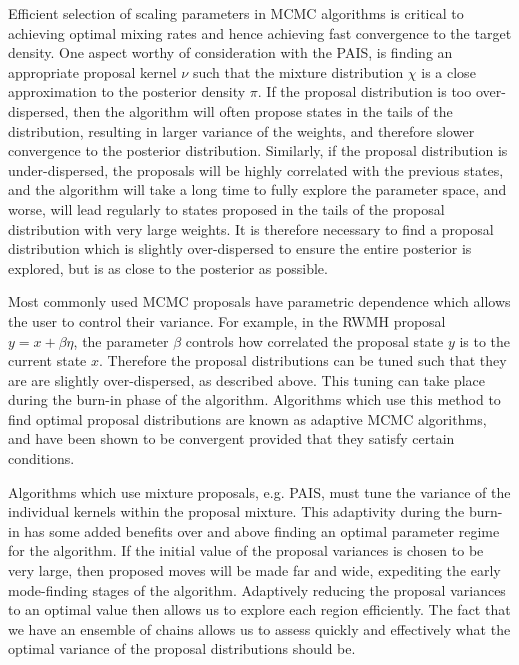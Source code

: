 \documentclass[final]{siamltex}
\begin{document}
Efficient selection of scaling parameters in MCMC algorithms is
critical to achieving optimal mixing rates and hence achieving fast
convergence to the target density. One aspect worthy of  consideration
with the PAIS, is finding an appropriate proposal kernel $\nu$ such
that the mixture distribution
$\chi$ is a close approximation to the posterior density $\pi$. If the
proposal distribution is too over-dispersed, then the algorithm will often
propose states in the tails of the distribution, resulting in larger
variance of the weights, and therefore slower convergence to the
posterior distribution. Similarly, if the proposal distribution is
under-dispersed, the proposals will be highly correlated with the
previous states, and the algorithm will take a long time to fully explore
the parameter space, and worse, will lead regularly to states proposed
in the tails of the proposal distribution with very large weights. It is therefore necessary to find a proposal
distribution which is slightly over-dispersed to ensure the entire
posterior is explored\cite{gelman1992inference}, but is as close to the
posterior as possible.

Most commonly used MCMC proposals have parametric dependence which
allows the user to control their variance. For example, in the RWMH
proposal $y = x + \beta \eta$, the parameter $\beta$ controls how
correlated the proposal state $y$ is to the current state
$x$. Therefore the proposal distributions can be tuned such that they are are slightly over-dispersed, as described
above. This tuning can take place during the burn-in phase of the
algorithm. Algorithms which use this method to find optimal proposal
distributions are known as adaptive MCMC algorithms, and have been
shown to be convergent provided that they satisfy certain conditions\cite{roberts2007coupling,roberts2009examples}.

Algorithms which use mixture proposals, e.g. PAIS, must tune the
variance of the individual kernels within the proposal mixture. This
adaptivity during the burn-in has some added benefits over and above
finding an optimal parameter regime for the algorithm. If the initial
value of the proposal variances is chosen to be very large, then
proposed moves will be made far and wide, expediting the early
mode-finding stages of the algorithm. Adaptively reducing the proposal variances to an
optimal value then allows us to explore each region efficiently. The
fact that we have an ensemble of chains allows us to assess quickly and
effectively what the optimal variance of the proposal distributions
should be.
\end{document}
